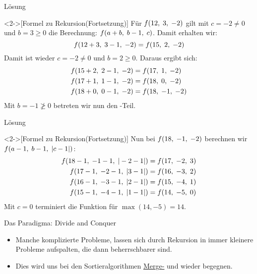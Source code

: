 \begin{frame}[c]{Lösung}
    \addtocounter{solve}{-1}%
    \begin{solve}<2->[Formel zu Rekursion\hfill(Fortsetzung)]
        \pause{}\pause{}Für \(\f(12, 3, -2)\) gilt mit \(c = -2 \neq 0\) und \(b = 3 \geq 0\) die Berechnung: \(\f(a + b, b - 1, c)\). Damit erhalten wir:\pause{}
\begin{equation*}
    \f(12 + 3, 3 - 1, -2) = \f(15, 2, -2)
\end{equation*}
        \pause{}Damit ist wieder  \(c = -2 \neq 0\) und \(b = 2 \geq 0\). Daraus ergibt sich:\pause{}
\begin{align*}
    \f(15 + 2, 2 - 1, -2) & = \f(17, 1, -2)\\
    \f(17 + 1, 1 - 1, -2) &= \f(18, 0, -2)\\
    \f(18 + 0, 0 - 1, -2) &= \f(18, -1, -2)
\end{align*}
        \pause{}Mit \(b = -1 \not\geq 0\) betreten wir nun den -Teil.
    \end{solve}
\end{frame}

\begin{frame}[c]{Lösung}
    \addtocounter{solve}{-1}%
    \begin{solve}<2->[Formel zu Rekursion\hfill(Fortsetzung)]
        \pause{}\pause{}Nun bei \(\f(18, -1, -2)\) berechnen wir \(\f(a - 1, b -1, |c - 1|)\):\pause{}
\begin{align*}
    \f(18 - 1, -1 - 1, |-2 - 1 |) &= \f(17, -2, 3) \\
    \f(17 - 1, -2 - 1, |3 - 1 |) &= \f(16, -3, 2) \\
    \f(16 - 1, -3 - 1, |2 - 1 |) &= \f(15, -4, 1) \\
    \f(15 - 1, -4 - 1, |1 - 1 |) &= \f(14, -5, 0)
\end{align*}
    \pause{}Mit \(c = 0\) terminiert die Funktion für \(\max(14, -5) = 14\).
    \end{solve}
\end{frame}
\endgroup
\fi

\begin{frame}{Das Paradigma: Divide and Conquer}
    \begin{itemize}[<+(1)->]
        \widei
        \item Manche komplizierte Probleme,\pause{} lassen sich durch Rekursion in immer kleinere Probleme aufspalten, die dann beherrschbarer sind.
        \item Dies wird uns bei den Sortieralgorithmen \hyperlink{mrk:sort-Mergesort}{Merge-} und  wieder begegnen.
    \end{itemize}
\end{frame}

